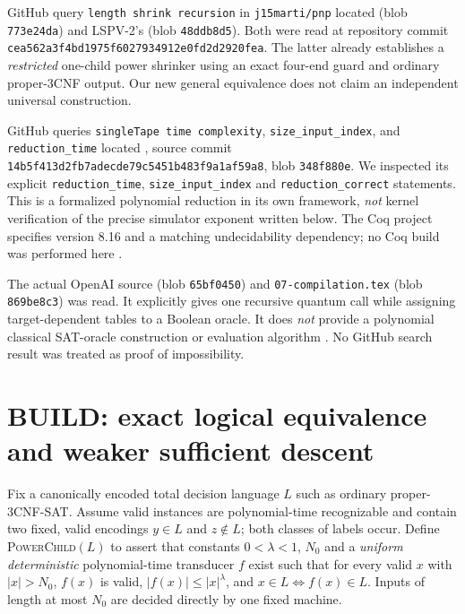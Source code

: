 \documentclass[11pt]{article}
\begin{document}
GitHub query \texttt{length shrink recursion} in \texttt{j15marti/pnp} located  (blob \texttt{773e24da}) and LSPV-2's  (blob \texttt{48ddb8d5}). Both were read at repository commit \texttt{cea562a3f4bd1975f602}\allowbreak\texttt{7934912e0fd2d2920fea}. The latter already establishes a \emph{restricted} one-child power shrinker using an exact four-end guard and ordinary proper-3CNF output. Our new general equivalence does not claim an independent universal construction.

GitHub queries \texttt{singleTape time complexity}, \texttt{size\_input\_index}, and \texttt{reduction\_time} located , source commit \texttt{14b5f413d2fb7adecde7}\allowbreak\texttt{9c5451b483f9a1af59a8}, blob \texttt{348f880e}. We inspected its explicit \texttt{reduction\_time}, \texttt{size\_input\_index} and \texttt{reduction\_correct} statements. This is a formalized polynomial reduction in its own framework, \emph{not} kernel verification of the precise simulator exponent written below. The Coq project specifies version 8.16 and a matching undecidability dependency; no Coq build was performed here \cite{coq}.

The actual OpenAI source  (blob \texttt{65bf0450}) and \texttt{07-compilation.tex} (blob \texttt{869be8c3}) was read. It explicitly gives one recursive quantum call while assigning target-dependent tables to a Boolean oracle. It does \emph{not} provide a polynomial classical SAT-oracle construction or evaluation algorithm \cite{openai}. No GitHub search result was treated as proof of impossibility.

\section{BUILD: exact logical equivalence and weaker sufficient descent}
Fix a canonically encoded total decision language $L$ such as ordinary proper-3CNF-SAT. Assume valid instances are polynomial-time recognizable and contain two fixed, valid encodings $y\in L$ and $z\notin L$; both classes of labels occur. Define \textsc{PowerChild}$(L)$ to assert that constants $0<\lambda<1$, $N_0$ and a \emph{uniform deterministic} polynomial-time transducer $f$ exist such that for every valid $x$ with $|x|>N_0$, $f(x)$ is valid, $|f(x)|\le|x|^\lambda$, and $x\in L\iff f(x)\in L$. Inputs of length at most $N_0$ are decided directly by one fixed machine.
\end{document}

